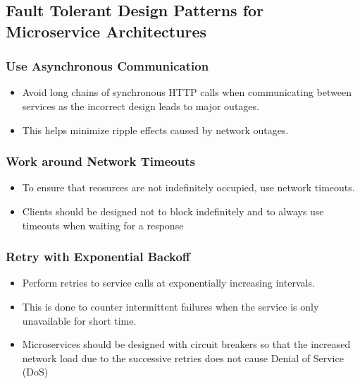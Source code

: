 \documentclass{article}
\begin{document}
\subsection{Fault Tolerant Design Patterns for Microservice Architectures}
\subsubsection{Use Asynchronous Communication}
\begin{itemize}
    \item Avoid long chains of synchronous HTTP calls when communicating between services as the incorrect design leads to major outages. 
    
    \item This helps minimize ripple effects caused by network outages.
\end{itemize}

\subsubsection{Work around Network Timeouts}
\begin{itemize}
    \item To ensure that reosurces are not indefinitely occupied, use network timeouts.
    
    \item Clients should be designed not to block indefinitely and to always use timeouts when waiting for a response
\end{itemize}

\subsubsection{Retry with Exponential Backoff}
\begin{itemize}
    \item Perform retries to service calls at exponentially increasing intervals. 
    
    
    \item This is done to counter intermittent failures when the service is only unavailable for short time. 
    
    \item Microservices should be designed with circuit breakers so that the increased network load due to the successive retries does not cause Denial of Service (DoS)
\end{itemize}
\end{document}
